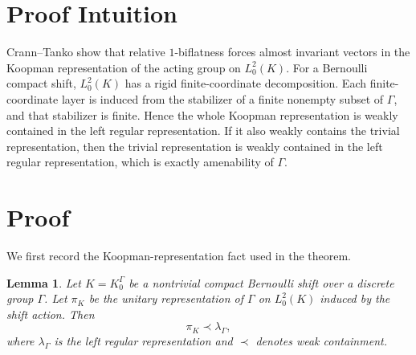 \documentclass[11pt]{article}
\newtheorem{lemma}{Lemma}
\begin{document}
\section*{Proof Intuition}

Crann--Tanko show that relative \(1\)-biflatness forces almost invariant
vectors in the Koopman representation of the acting group on
\(L^2_0(K)\). For a Bernoulli compact shift, \(L^2_0(K)\) has a rigid
finite-coordinate decomposition. Each finite-coordinate layer is induced
from the stabilizer of a finite nonempty subset of \(\Gamma\), and that
stabilizer is finite. Hence the whole Koopman representation is weakly
contained in the left regular representation. If it also weakly contains
the trivial representation, then the trivial representation is weakly
contained in the left regular representation, which is exactly amenability
of \(\Gamma\).

\section*{Proof}

We first record the Koopman-representation fact used in the theorem.

\begin{lemma}
Let \(K=K_0^\Gamma\) be a nontrivial compact Bernoulli shift over a
discrete group \(\Gamma\). Let \(\pi_K\) be the unitary representation of
\(\Gamma\) on \(L^2_0(K)\) induced by the shift action. Then
\[
  \pi_K \prec \lambda_\Gamma,
\]
where \(\lambda_\Gamma\) is the left regular representation and
\(\prec\) denotes weak containment.
\end{lemma}
\end{document}
